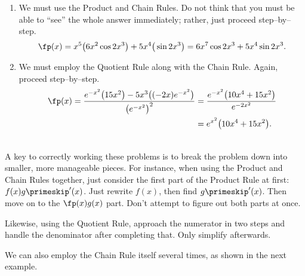 {
\begin{enumerate}
\item		We must use the Product and Chain Rules. Do not think that you must be able to ``see'' the whole answer immediately; rather, just proceed step--by--step.
		\[
		\fp(x) = x^5\big(6x^2\cos 2x^3\big) + 5x^4\big(\sin 2x^3\big)= 6x^7\cos2x^3+5x^4\sin 2x^3.
		\]
\item		We must employ the Quotient Rule along with the Chain Rule. Again, proceed step--by--step.
\begin{align*}
\fp(x) = \frac{e^{-x^2}\big(15x^2\big) - 5x^3\big((-2x)e^{-x^2}\big)}{\big(e^{-x^2}\big)^2} &=\frac{e^{-x^2}\big(10x^4+15x^2\big)}{e^{-2x^2}}\\
 &= e^{x^2}\big(10x^4+15x^2\big).
\end{align*}
\end{enumerate}
\baselineskip
}\\

A key to correctly working these problems is to break the problem down into smaller, more manageable pieces. For instance, when using the Product and Chain Rules together, just consider the first part of the Product Rule at first: $f(x)g\primeskip'(x)$. Just rewrite $f(x)$, then find $g\primeskip'(x)$. Then move on to the $\fp(x)g(x)$ part. Don't attempt to figure out both parts at once.

Likewise, using the Quotient Rule, approach the numerator in two steps and handle the denominator after completing that. Only simplify afterwards.

We can also employ the Chain Rule itself several times, as shown in the next example.\\

